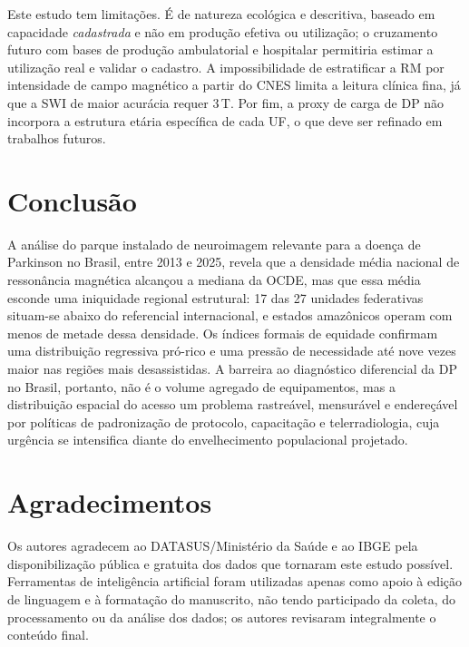 \documentclass[12pt,a4paper,oneside]{article}
\begin{document}
Este estudo tem limitações. É de natureza ecológica e descritiva,
baseado em capacidade \textit{cadastrada} e não em produção efetiva ou
utilização; o cruzamento futuro com bases de produção ambulatorial e
hospitalar permitiria estimar a utilização real e validar o cadastro.
A impossibilidade de estratificar a RM por intensidade de campo
magnético a partir do CNES limita a leitura clínica fina, já que a SWI
de maior acurácia requer 3\,T. Por fim, a proxy de carga de DP não
incorpora a estrutura etária específica de cada UF, o que deve ser
refinado em trabalhos futuros.

\section{Conclusão}

A análise do parque instalado de neuroimagem relevante para a doença
de Parkinson no Brasil, entre 2013 e 2025, revela que a densidade
média nacional de ressonância magnética alcançou a mediana da OCDE,
mas que essa média esconde uma iniquidade regional estrutural: 17 das
27 unidades federativas situam-se abaixo do referencial internacional,
e estados amazônicos operam com menos de metade dessa densidade. Os
índices formais de equidade confirmam uma distribuição regressiva
pró-rico e uma pressão de necessidade até nove vezes maior nas regiões
mais desassistidas. A barreira ao diagnóstico diferencial da DP no
Brasil, portanto, não é o volume agregado de equipamentos, mas a
distribuição espacial do acesso \textemdash{} um problema rastreável,
mensurável e endereçável por políticas de padronização de protocolo,
capacitação e telerradiologia, cuja urgência se intensifica diante do
envelhecimento populacional projetado.

\section*{Agradecimentos}

Os autores agradecem ao DATASUS/Ministério da Saúde e ao IBGE pela
disponibilização pública e gratuita dos dados que tornaram este estudo
possível. Ferramentas de inteligência artificial foram utilizadas
apenas como apoio à edição de linguagem e à formatação do manuscrito,
não tendo participado da coleta, do processamento ou da análise dos
dados; os autores revisaram integralmente o conteúdo final.
\end{document}
